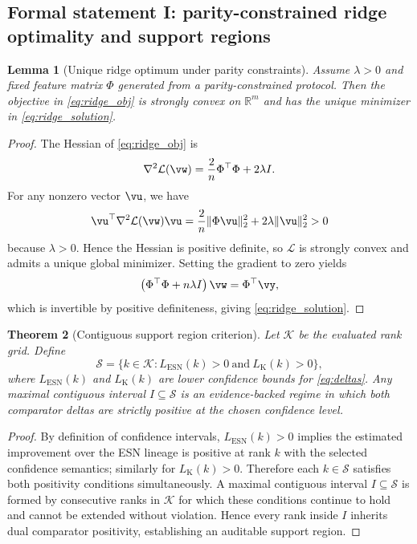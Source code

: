 \documentclass{article} %
\newtheorem{theorem}{Theorem}[section]
\newtheorem{lemma}[theorem]{Lemma}
\begin{document}
\subsection{Formal statement I: parity-constrained ridge optimality and support regions}
\begin{lemma}[Unique ridge optimum under parity constraints]\label{lem:ridge_unique}
Assume $\lambda>0$ and fixed feature matrix $\Phi$ generated from a parity-constrained protocol. Then the objective in \eqref{eq:ridge_obj} is strongly convex on $\mathbb{R}^m$ and has the unique minimizer in \eqref{eq:ridge_solution}.
\end{lemma}
\begin{proof}
The Hessian of \eqref{eq:ridge_obj} is
\[
\nabla^2\mathcal{L}(\vw)=\frac{2}{n}\Phi^\top\Phi+2\lambda I.
\]
For any nonzero vector $\vu$, we have
\[
\vu^\top\nabla^2\mathcal{L}(\vw)\vu=\frac{2}{n}\|\Phi\vu\|_2^2+2\lambda\|\vu\|_2^2>0
\]
because $\lambda>0$. Hence the Hessian is positive definite, so $\mathcal{L}$ is strongly convex and admits a unique global minimizer. Setting the gradient to zero yields
\[
\left(\Phi^\top\Phi+n\lambda I\right)\vw=\Phi^\top\vy,
\]
which is invertible by positive definiteness, giving \eqref{eq:ridge_solution}.\qedhere
\end{proof}

\begin{theorem}[Contiguous support region criterion]\label{thm:contiguous}
Let $\mathcal{K}$ be the evaluated rank grid. Define
\[
\mathcal{S}=\{k\in\mathcal{K}:L_{\text{ESN}}(k)>0\ \text{and}\ L_{\text{K}}(k)>0\},
\]
where $L_{\text{ESN}}(k)$ and $L_{\text{K}}(k)$ are lower confidence bounds for \eqref{eq:deltas}. Any maximal contiguous interval $I\subseteq\mathcal{S}$ is an evidence-backed regime in which both comparator deltas are strictly positive at the chosen confidence level.
\end{theorem}
\begin{proof}
By definition of confidence intervals, $L_{\text{ESN}}(k)>0$ implies the estimated improvement over the ESN lineage is positive at rank $k$ with the selected confidence semantics; similarly for $L_{\text{K}}(k)>0$. Therefore each $k\in\mathcal{S}$ satisfies both positivity conditions simultaneously. A maximal contiguous interval $I\subseteq\mathcal{S}$ is formed by consecutive ranks in $\mathcal{K}$ for which these conditions continue to hold and cannot be extended without violation. Hence every rank inside $I$ inherits dual comparator positivity, establishing an auditable support region.\qedhere
\end{proof}
\end{document}
